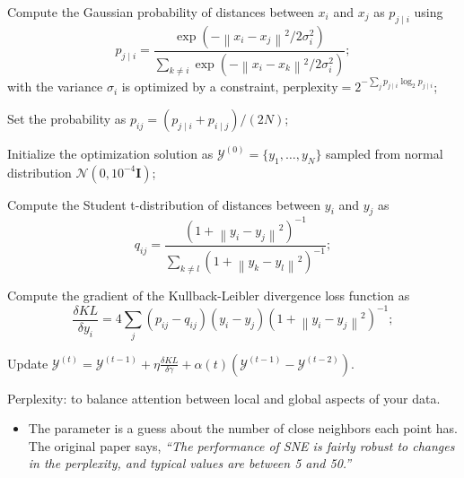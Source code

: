 \documentclass[
]{article}
\providecommand{\tightlist}{%
  \setlength{\itemsep}{0pt}\setlength{\parskip}{0pt}}
\begin{document}
\begin{algorithm}[!htb]
  \caption{t-SNE}
  \label{alg:tsne}
  \DontPrintSemicolon
  \SetAlgoLined
  \BlankLine
  \begin{algorithmic}[1]

  \STATE Compute the Gaussian probability of distances between $x_i$ and $x_j$ as $p_{j \mid i}$ using
  $$
    p_{j \mid i}=\frac{\exp \left(-\left\|x_{i}-x_{j}\right\|^{2} / 2 \sigma_{i}^{2}\right)}{\sum_{k \neq i} \exp \left(-\left\|x_{i}-x_{k}\right\|^{2} / 2 \sigma_{i}^{2}\right)};
  $$
  with the variance $\sigma_{i}$ is optimized by a constraint, $\text{perplexity} = 2 ^ {-\sum_j{p_{j \mid i} \log_2{p_{j \mid i}}}}$; 

  \STATE Set the probability as $p_{i j}=(p_{j \mid i}+p_{i \mid j}) / (2 N)$;

  \STATE Initialize the optimization solution as $\mathcal{Y}^{(0)} = \{ y_1, \dots, y_N \}$ sampled from normal distribution $\mathcal{N}(0, 10^{-4} \boldsymbol{I})$;


  \STATE Compute the Student t-distribution of distances between $y_i$ and $y_j$ as 
  $$
    q_{i j}=\frac{\left(1+\left\|y_{i}-y_{j}\right\|^{2}\right)^{-1}}{\sum_{k \neq l}\left(1+\left\|y_{k}-y_{l}\right\|^{2}\right)^{-1}};
  $$

  \STATE Compute the gradient of the Kullback-Leibler divergence loss function as
  $$
    \frac{\delta KL}{\delta y_{i}}=4 \sum_{j}\left(p_{i j}-q_{i j}\right)\left(y_{i}-y_{j}\right)\left(1+\left\|y_{i}-y_{j}\right\|^{2}\right)^{-1} ;
  $$

  \STATE Update $ \mathcal{Y}^{(t)}=\mathcal{Y}^{(t-1)}+\eta \frac{\delta KL}{\delta \gamma}+\alpha(t)\left(\mathcal{Y}^{(t-1)}-\mathcal{Y}^{(t-2)}\right). $

  \ENDFOR

  \end{algorithmic}
\end{algorithm}

Perplexity: to balance attention between local and global aspects of your data.

\begin{itemize}
\tightlist
\item
  The parameter is a guess about the number of close neighbors each point has. The original paper says, \emph{``The performance of SNE is fairly robust to changes in the perplexity, and typical values are between 5 and 50.''}
\end{itemize}
\end{document}
